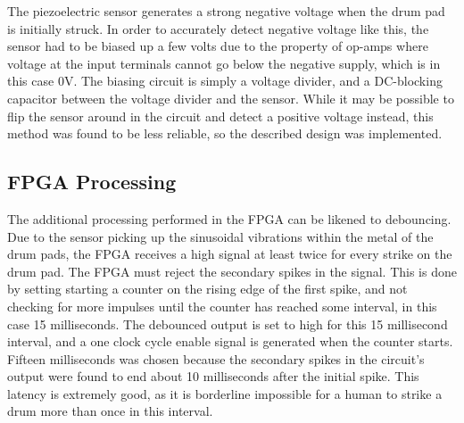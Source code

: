 \documentclass{subfile}
\begin{document}
  The piezoelectric sensor generates a strong negative voltage when the drum pad 
  is initially struck.
  In order to accurately detect negative voltage like this, the sensor had to be biased 
  up a few volts due to the property of op-amps where voltage at the input terminals 
  cannot go below the negative supply, which is in this case 0V.
  The biasing circuit is simply a voltage divider, and a DC-blocking capacitor between the 
  voltage divider and the sensor.
  While it may be possible to flip the sensor around in the circuit and detect a positive 
  voltage instead, this method was found to be less reliable, so the described design was 
  implemented.

  \subsection{FPGA Processing} 
  The additional processing performed in the FPGA can be likened to debouncing. 
  Due to the sensor picking up the sinusoidal vibrations within the metal of the drum pads, 
  the FPGA receives a high signal at least twice for every strike on the drum pad. 
  The FPGA must reject the secondary spikes in the signal. 
  This is done by setting starting a counter on the rising edge of the first spike, 
  and not checking for more impulses until the counter has reached some 
  interval, in this case 15 milliseconds.
  The debounced output is set to high for this 15 millisecond interval, and a one 
  clock cycle enable signal is generated when the counter starts.
  Fifteen milliseconds was chosen because the secondary spikes in the circuit's 
  output were found to end about 10 milliseconds after the initial spike.
  This latency is extremely good, as it is borderline impossible for a human to strike 
  a drum more than once in this interval.
\end{document}
